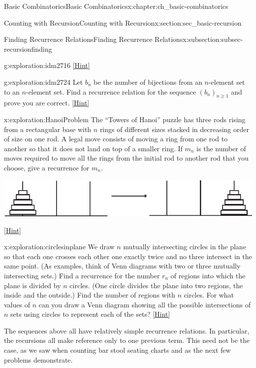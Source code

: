 \documentclass[oneside,10pt,]{book}
\numberwithin{equation}{chapter}
\begin{document}
\begin{chapterptx}{Basic Combinatorics}{}{Basic Combinatorics}{}{}{x:chapter:ch_basic-combinatorics}
\begin{sectionptx}{Counting with Recursion}{}{Counting with Recursion}{}{}{x:section:sec_basic-recursion}
\begin{subsectionptx}{Finding Recurrence Relations}{}{Finding Recurrence Relations}{}{}{x:subsection:subsec-recursionfinding}
\begin{exploration}{}{g:exploration:idm2716}
\space\hspace*{0pt}\hfill{\tiny\hyperlink{g:hint:idm2722-back}{[Hint]}}\end{exploration}
\begin{exploration}{}{g:exploration:idm2724}%
Let \(b_n\) be the number of bijections from an \(n\)-element set to an \(n\)-element set.  Find a recurrence relation for the sequence \((b_n)_{n \ge 1}\) and prove you are correct.%
\space\hspace*{0pt}\hfill{\tiny\hyperlink{g:hint:idm2731-back}{[Hint]}}\end{exploration}
\begin{exploration}{}{x:exploration:HanoiProblem}%
The ``Towers of Hanoi'' puzzle has three rods rising from a rectangular base with \(n\) rings of different sizes stacked in decreasing order of size on one rod. A legal move consists of moving a ring from one rod to another so that it does not land on top of a smaller ring. If \(m_n\) is the number of moves required to move all the rings from the initial rod to another rod that you choose, give a recurrence for \(m_n\).%
\begin{image}{0.25}{0.5}{0.25}%
\includegraphics[width=\linewidth]{images/Hanoi}
\end{image}%
\space\hspace*{0pt}\hfill{\tiny\hyperlink{g:hint:idm2743-back}{[Hint]}}\end{exploration}
\begin{exploration}{}{x:exploration:circlesinplane}%
We draw \(n\) mutually intersecting circles in the plane so that each one crosses each other one exactly twice and no three intersect in the same point. (As examples, think of Venn diagrams with two or three mutually intersecting sets.) Find a recurrence for the number \(r_n\) of regions into which the plane is divided by \(n\) circles. (One circle divides the plane into two regions, the inside and the outside.) Find the number of regions with \(n\) circles. For what values of \(n\) can you draw a Venn diagram showing all the possible intersections of \(n\) sets using circles to represent each of the sets?%
\space\hspace*{0pt}\hfill{\tiny\hyperlink{g:hint:idm2761-back}{[Hint]}}\end{exploration}
The sequences above all have relatively simple recurrence relations.  In particular, the recursions all make reference only to one previous term.  This need not be the case, as we saw when counting bar stool seating charts and as the next few problems demonstrate.%

\end{subsectionptx}
\end{sectionptx}
\end{chapterptx}
\end{document}
